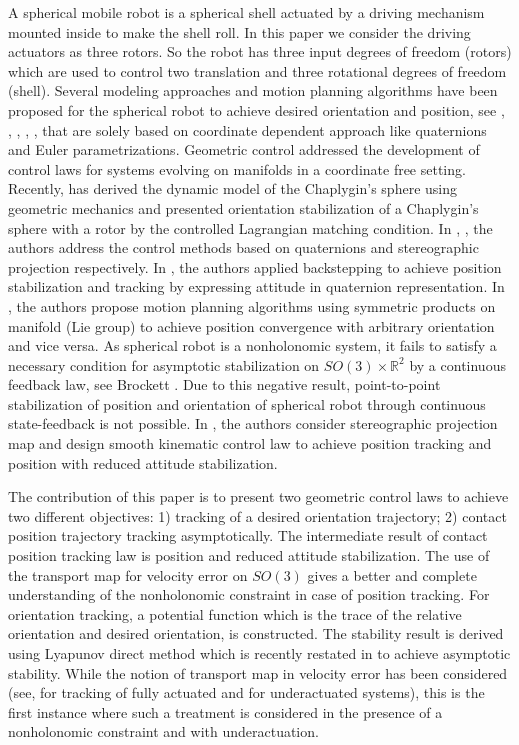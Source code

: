 \documentclass{ifacconf}
\begin{document}
A spherical mobile robot is a spherical shell actuated by a driving mechanism mounted inside to make the shell roll. In this paper we consider the driving actuators as three rotors. So the robot has three input degrees of freedom (rotors) which are used to control two translation and three rotational degrees of freedom (shell). Several modeling approaches and motion planning algorithms have been proposed for the spherical robot to achieve desired orientation and position,
 see \citep{joshi_banavar}, \citep{reg_n_chaotic_2013}, \citep{mukherjee1999}, \citep{bicchi1997}, \citep{Zhan_2008}, that are solely based on coordinate dependent approach like quaternions and Euler parametrizations. Geometric control addressed the development of control laws for systems evolving on manifolds in a coordinate free setting. Recently, \cite{schneider} has derived the dynamic model of the  Chaplygin's sphere using geometric mechanics and presented  orientation stabilization of a Chaplygin's sphere with a rotor by the controlled Lagrangian matching condition. In \citep{karimpur_2012}, \citep{muralidharan_mahindrakar}, the authors address the control methods based on quaternions and stereographic projection respectively. In \cite{karimpur_2012}, the authors applied backstepping to achieve position stabilization and tracking by expressing attitude in quaternion representation. In \citep{shen2008}, the authors propose motion planning algorithms using symmetric products on manifold (Lie group) to achieve position convergence with arbitrary orientation and vice versa. As spherical robot is a nonholonomic system, it fails to satisfy a necessary condition for asymptotic stabilization on $SO(3) \times \mathbb{R}^{2}$ by a continuous feedback law, see Brockett \citep{brockett}. Due to this negative result, point-to-point stabilization of position and orientation of spherical robot through continuous state-feedback is not possible. In \citep{muralidharan_mahindrakar}, the authors consider stereographic projection map and design smooth kinematic control law to achieve position tracking and position with reduced attitude stabilization. 

The contribution of this paper is to present two geometric control laws to achieve two different objectives: 1) tracking of a desired orientation trajectory; 2) contact position trajectory tracking asymptotically. The intermediate result of contact position tracking law is position and reduced attitude stabilization. The use of the transport map for velocity error on $SO(3)$ gives a better and complete understanding of the nonholonomic constraint in case of position tracking. For orientation tracking, a potential function which is the trace of the relative orientation and desired orientation, is constructed. The stability result is derived using Lyapunov direct method \citep{nijmeijer} which is recently restated in \citep{bullo_stability} to achieve asymptotic stability. While the notion of transport map in velocity error has been considered (see, \citep{book_bullo} for tracking of fully actuated and \citep{taeyoung_lee} for underactuated systems), this is the first instance where such a treatment is considered in the presence of a nonholonomic constraint and with underactuation. 
\end{document}
